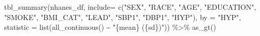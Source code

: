 \documentclass[
  letterpaper,
]{krantz}
\makeatletter
\newenvironment{Shaded}{\begin{snugshade}}{\end{snugshade}}
\newcommand{\AttributeTok}[1]{\textcolor[rgb]{0.40,0.45,0.13}{#1}}
\newcommand{\FunctionTok}[1]{\textcolor[rgb]{0.28,0.35,0.67}{#1}}
\newcommand{\NormalTok}[1]{\textcolor[rgb]{0.00,0.23,0.31}{#1}}
\newcommand{\SpecialCharTok}[1]{\textcolor[rgb]{0.37,0.37,0.37}{#1}}
\newcommand{\StringTok}[1]{\textcolor[rgb]{0.13,0.47,0.30}{#1}}
\newenvironment{kframe}{%
\medskip{}
\setlength{\fboxsep}{.8em}
 \def\at@end@of@kframe{}%
 \ifinner\ifhmode%
  \def\at@end@of@kframe{\end{minipage}}%
  \begin{minipage}{\columnwidth}%
 \fi\fi%
 \def\FrameCommand##1{\hskip\@totalleftmargin \hskip-\fboxsep
 \colorbox{shadecolor}{##1}\hskip-\fboxsep
     \hskip-\linewidth \hskip-\@totalleftmargin \hskip\columnwidth}%
 \MakeFramed {\advance\hsize-\width
   \@totalleftmargin\z@ \linewidth\hsize
   \@setminipage}}%
 {\par\unskip\endMakeFramed%
 \at@end@of@kframe}
\renewenvironment{Shaded}{\begin{kframe}}{\end{kframe}}
\makeatother
\begin{document}
\begin{Shaded}
\begin{Highlighting}[]
\FunctionTok{tbl\_summary}\NormalTok{(nhanes\_df, }\AttributeTok{include=} \FunctionTok{c}\NormalTok{(}\StringTok{"SEX"}\NormalTok{, }\StringTok{"RACE"}\NormalTok{, }\StringTok{"AGE"}\NormalTok{, }\StringTok{"EDUCATION"}\NormalTok{, }\StringTok{"SMOKE"}\NormalTok{,}
                                  \StringTok{"BMI\_CAT"}\NormalTok{, }\StringTok{"LEAD"}\NormalTok{, }\StringTok{"SBP1"}\NormalTok{, }\StringTok{"DBP1"}\NormalTok{, }\StringTok{"HYP"}\NormalTok{),}
           \AttributeTok{by =} \StringTok{"HYP"}\NormalTok{, }\AttributeTok{statistic =} \FunctionTok{list}\NormalTok{(}\FunctionTok{all\_continuous}\NormalTok{() }\SpecialCharTok{\textasciitilde{}} \StringTok{"\{mean\} (\{sd\})"}\NormalTok{)) }\SpecialCharTok{\%\textgreater{}\%} 
  \FunctionTok{as\_gt}\NormalTok{() }
\end{Highlighting}
\end{Shaded}
\end{document}

